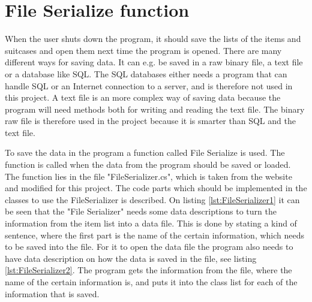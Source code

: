 \section{File Serialize function}
When the user shuts down the program, it should save the lists of the items and suitcases and open them next time the program is opened. There are many different ways for saving data. It can e.g. be saved in a raw binary file, a text file or a database like SQL.
The SQL databases either needs a program that can handle SQL or an Internet connection to a server, and is therefore not used in this project. A text file is an more complex way of saving data because the program will need methods both for writing and reading the text file. The binary raw file is therefore used in the project because it is smarter than SQL and the text file.

To save the data in the program a function called File Serialize is used. The function is called when the data from the program should be saved or loaded. The function lies in the file "FileSerializer.cs", which is taken from the website \citep{FileSeria} and modified for this project. The code parts which should be implemented in the classes to use the FileSerializer is described.
On listing \ref{lst:FileSerializer1} it can be seen that the "File Serializer" needs some data descriptions to turn the information from the item list into a data file. This is done by stating a kind of sentence, where the first part is the name of the certain information, which needs to be saved into the file. 
For it to open the data file the program also needs to have data description on how the data is saved in the file, see listing \ref{lst:FileSerializer2}. The program gets the information from the file, where the name of the certain information is, and puts it into the class list for each of the information that is saved.